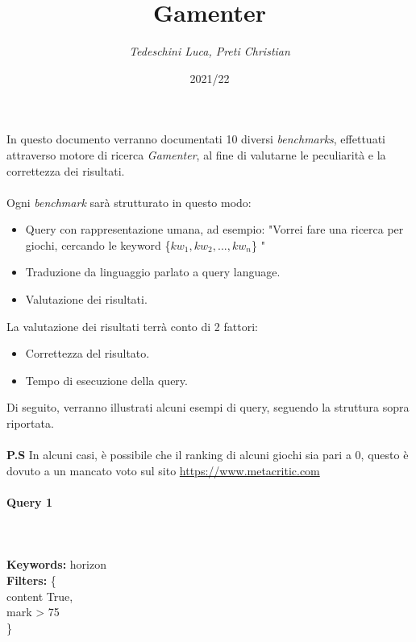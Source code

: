 \documentclass[12pt]{article}
\begin{document}
 \noindent
\title{\Huge \textbf{Gamenter}}
\author{\textit{Tedeschini Luca, Preti Christian}}
\date{2021/22}
\maketitle \noindent
In questo documento verranno documentati 10 diversi \textit{benchmarks}, effettuati attraverso motore di ricerca \textit{Gamenter}, al fine di valutarne le peculiarità e la correttezza dei risultati.
\\ \\
Ogni \textit{benchmark} sarà strutturato in questo modo:

\begin{itemize}
	\item Query con rappresentazione umana, ad esempio: "Vorrei fare una ricerca per giochi, cercando le keyword \{$kw_1, kw_2, ..., kw_n$\} "
	
	\item Traduzione da linguaggio parlato a query language.

	\item Valutazione dei risultati.

\end{itemize}

\noindent La valutazione dei risultati terrà conto di 2 fattori:

\begin{itemize}
	\item Correttezza del risultato.
	\item Tempo di esecuzione della query.
\end{itemize} 

\noindent Di seguito, verranno illustrati alcuni esempi di query, seguendo la struttura sopra riportata. \\ \\
\textbf{P.S} In alcuni casi, è possibile che il ranking di alcuni giochi sia pari a 0, questo è dovuto a un mancato voto sul sito \url{https://www.metacritic.com}
\pagebreak

\paragraph{\LARGE{Query 1}} ~ \\ \\

\noindent \textbf{Keywords: } horizon \\
\textbf{Filters: } \{ \\ 
	\indent content True, \\
	\indent mark > 75 \\
\}
 	
\end{document}
